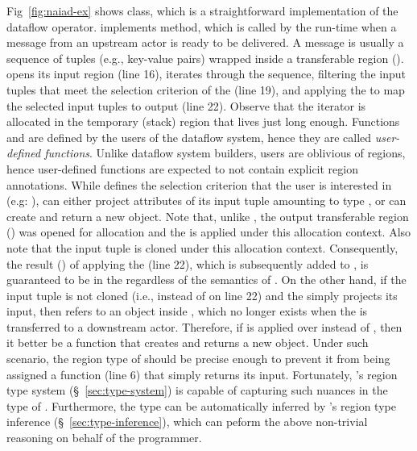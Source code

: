Fig~\ref{fig:naiad-ex} shows  class, which is a
straightforward implementation of the  dataflow operator.
 implements  method, which is called by
the run-time when a message from an upstream actor is ready to be
delivered. A message is usually a sequence of tuples (e.g., key-value
pairs) wrapped inside a transferable region ().
 opens its input region  (line 16), iterates
through the sequence, filtering the input tuples that meet the
selection criterion of the  (line 19), and applying the
 to map the selected input tuples to output (line 22).
Observe that the iterator is allocated in the temporary (stack) region
 that lives just long enough.  Functions  and
 are defined by the users of the dataflow system, hence
they are called \emph{user-defined functions}.  Unlike dataflow system
builders, users are oblivious of regions, hence user-defined functions
are expected to not contain explicit region annotations. While
 defines the selection criterion that the user is
interested in (e.g: ),  can either project
attributes of its input tuple amounting to type , or can
create and return a new  object. Note that, unlike ,
the output transferable region () was opened for allocation
and the  is applied under this allocation context. Also note
that the input tuple is cloned under this allocation context.
Consequently, the result () of applying the  (line
22), which is subsequently added to , is guaranteed to be in
the  regardless of the semantics of . On the other
hand, if the input tuple is not cloned (i.e.,  instead of
 on line 22) and the  simply projects its
input, then  refers to an object inside , which no
longer exists when the  is transferred to a downstream
actor. Therefore, if  is applied over  instead of
, then it better be a function that creates and returns
a new  object. Under such scenario, the region type of
 should be precise enough to prevent it from
being assigned a function (line 6) that simply returns its input.
Fortunately, \name's region type system (\S~\ref{sec:type-system}) is
capable of capturing such nuances in the type of
. Furthermore, the type can be automatically
inferred by \name's region type inference
(\S~\ref{sec:type-inference}), which can peform the above non-trivial
reasoning on behalf of the programmer.

